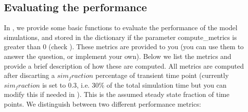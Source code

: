 \documentclass{cmc}
\begin{document}
\subsection*{Evaluating the performance}
In , we provide some basic functions to evaluate the performance
of the model simulations, and stored in the dictionary  if the parameter compute\_metrics is greater than 0 (check ). These metrics are provided to you (you can use them to answer the question, or implement your own). Below we list the metrics and provide a brief description of how these are computed. All metrics are computed after discarting a $sim_fraction$ percentage of transient time point (currently $sim_fraction$ is set to 0.3, i.e. $30\%$ of the total simulation time but you can modify this if needed in ). This is the assumed steady state fraction of time points. We distinguish between two different performance metrics:
\end{document}

